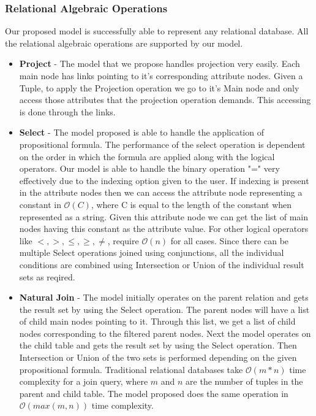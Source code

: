 \documentclass[12pt, oneside]{book}
\begin{document}
\subsubsection{Relational Algebraic Operations}
Our proposed model is successfully able to represent any relational database. All the relational algebraic operations are supported by our model.
\begin{itemize}
 \item \textbf{Project} - The model that we propose handles projection very easily. Each main node has links pointing to it's corresponding attribute nodes.
 Given a Tuple, to apply the Projection operation we go to it's Main node and only access those attributes that the projection operation demands. This accessing is done through
 the links.
 \item \textbf{Select} - The model proposed is able to handle the application of propositional formula.
 The performance of the select operation is dependent on the order in which the formula are applied along with the logical operators.
 Our model is able to handle the binary operation "=" very effectively due to the indexing option given to the user. 
 If indexing is present in the attribute nodes then we can access the attribute node representing a constant in $\mathcal{O}(C)$, where C is equal to the length 
 of the constant when represented as a string. Given this attribute node
 we can get the list of main nodes having this constant as the attribute value. For other logical operators like $ <, >, \leq, \geq, \neq$,  require $\mathcal{O}(n)$ for all cases.
 Since there can be multiple Select operations joined using conjunctions, all the individual conditions are combined using Intersection or Union of the individual result sets as reqired.
 \item \textbf{Natural Join} - The model initially operates on the parent relation and gets the result set by using the Select operation. The parent nodes will have a list of child main nodes pointing to it.
 Through this list, we get a list of child nodes corresponding to the filtered parent nodes. Next the model operates on the child table and gets the result set by using the Select operation.
 Then Intersection or Union of the two sets is performed depending on the given propositional formula. Traditional relational databases take $\mathcal{O}(m * n)$ time complexity for a join query, where $m$ and $n$
 are the number of tuples in the parent and child table. The model proposed does the same operation in $\mathcal{O}(max(m, n))$ time complexity.
 \end{itemize}
\end{document}
